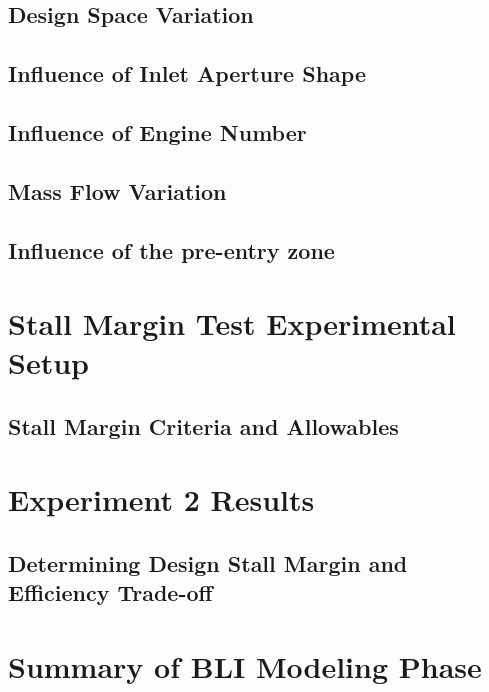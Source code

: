 \subsection{Design Space Variation}

\subsection{Influence of Inlet Aperture Shape}

\subsection{Influence of Engine Number}

\subsection{Mass Flow Variation}

\subsection{Influence of the pre-entry zone}

\section{Stall Margin Test Experimental Setup}

\subsection{Stall Margin Criteria and Allowables}

\section{Experiment 2 Results}

\subsection{Determining Design Stall Margin and Efficiency Trade-off}

\section{Summary of BLI Modeling Phase}